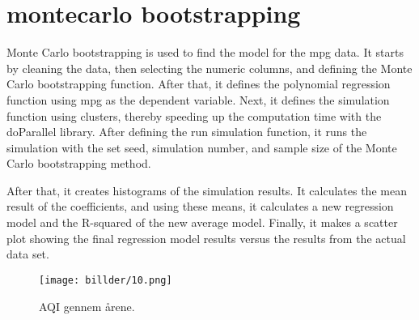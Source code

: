 

\section{montecarlo bootstrapping }

Monte Carlo bootstrapping is used to find the model for the mpg data. It starts by cleaning the data, then selecting the numeric columns, and defining the Monte Carlo bootstrapping function. After that, it defines the polynomial regression function using mpg as the dependent variable. Next, it defines the simulation function using clusters, thereby speeding up the computation time with the doParallel library. After defining the run simulation function, it runs the simulation with the set seed, simulation number, and sample size of the Monte Carlo bootstrapping method.

After that, it creates histograms of the simulation results. It calculates the mean result of the coefficients, and using these means, it calculates a new regression model and the R-squared of the new average model. Finally, it makes a scatter plot showing the final regression model results versus the results from the actual data set.
%

\begin{figure}[h] 
	\centering
	\texttt{[image: billder/10.png]}
	\caption{AQI gennem årene.}
	\label{fig:j06}
\end{figure}

